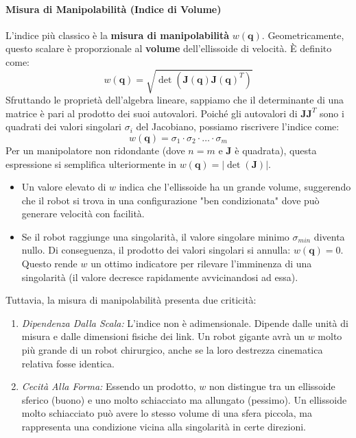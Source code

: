 \documentclass[11pt, a4paper]{report}
\begin{document}
\paragraph{Misura di Manipolabilità (Indice di Volume)}
L'indice più classico è la \textbf{misura di manipolabilità} $w(\bm{q})$. Geometricamente, questo scalare è proporzionale al \textbf{volume} dell'ellissoide di velocità. È definito come:
\[
    w(\bm{q}) = \sqrt{\det\left(\bm{J}(\bm{q})\bm{J}(\bm{q})^T\right)}
\]
Sfruttando le proprietà dell'algebra lineare, sappiamo che il determinante di una matrice è pari al prodotto dei suoi autovalori. Poiché gli autovalori di $\bm{J}\bm{J}^T$ sono i quadrati dei valori singolari $\sigma_i$ del Jacobiano, possiamo riscrivere l'indice come:
\[
    w(\bm{q}) = \sigma_1 \cdot \sigma_2 \cdot \dots \cdot \sigma_m
\]
Per un manipolatore non ridondante (dove $n=m$ e $\bm{J}$ è quadrata), questa espressione si semplifica ulteriormente in $w(\bm{q}) = |\det(\bm{J})|$.

\begin{itemize}
    \item Un valore elevato di $w$ indica che l'ellissoide ha un grande volume, suggerendo che il robot si trova in una configurazione "ben condizionata" dove può generare velocità con facilità.
    \item Se il robot raggiunge una singolarità, il valore singolare minimo $\sigma_{min}$ diventa nullo. Di conseguenza, il prodotto dei valori singolari si annulla: $w(\bm{q}) = 0$. Questo rende $w$ un ottimo indicatore per rilevare l'imminenza di una singolarità (il valore decresce rapidamente avvicinandosi ad essa).
\end{itemize}

Tuttavia, la misura di manipolabilità presenta due criticità:
\begin{enumerate}
    \item \textit{Dipendenza Dalla Scala:} L'indice non è adimensionale. Dipende dalle unità di misura e dalle dimensioni fisiche dei link. Un robot gigante avrà un $w$ molto più grande di un robot chirurgico, anche se la loro destrezza cinematica relativa fosse identica.
    \item \textit{Cecità Alla Forma:} Essendo un prodotto, $w$ non distingue tra un ellissoide sferico (buono) e uno molto schiacciato ma allungato (pessimo). Un ellissoide molto schiacciato può avere lo stesso volume di una sfera piccola, ma rappresenta una condizione vicina alla singolarità in certe direzioni.
\end{enumerate}
\end{document}
